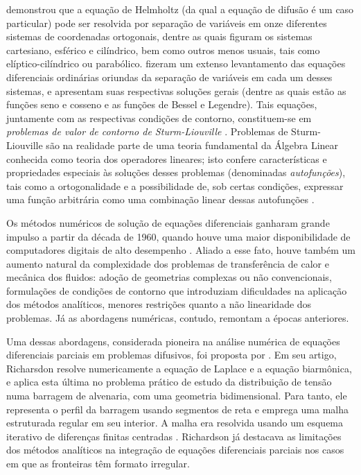 \cite{artigo_einsenhart, artigo_einsenhart_2} demonstrou que a equação de Helmholtz (da qual a equação
de difusão é um caso particular) pode ser resolvida por separação de variáveis em onze diferentes
sistemas de coordenadas ortogonais, dentre as quais figuram os sistemas cartesiano, esférico e cilíndrico, bem como outros menos usuais, tais
como elíptico-cilíndrico ou parabólico. \cite{livro_moon} fizeram um extenso levantamento das equações diferenciais ordinárias
oriundas da separação de variáveis em cada um desses sistemas, e apresentam suas respectivas soluções gerais (dentre as quais estão as funções
seno e cosseno e as funções de Bessel e Legendre). Tais equações, juntamente com as respectivas condições de contorno, constituem-se
em \textit{problemas de valor de contorno de Sturm-Liouville} \citep{artigo_sturm, artigo_liouville}. Problemas de Sturm-Liouville são na realidade
parte de uma teoria fundamental da Álgebra Linear conhecida como teoria dos operadores lineares; isto confere características e propriedades
especiais às soluções desses problemas (denominadas \textit{autofunções}), tais como a ortogonalidade e a possibilidade de, sob certas condições, expressar uma função arbitrária
como uma combinação linear dessas autofunções \citep{livro_boyce, livro_axler}.

Os métodos numéricos de solução de equações diferenciais ganharam grande impulso a partir da década de 1960, quando houve uma maior disponibilidade
de computadores digitais de alto desempenho \citep{livro_tanehill}. Aliado a esse fato, houve também um aumento natural da complexidade dos problemas de transferência
de calor e mecânica dos fluidos: adoção de geometrias complexas ou não convencionais, formulações de condições de contorno que introduziam dificuldades na
aplicação dos métodos analíticos, menores restrições quanto a não linearidade dos problemas. Já as abordagens numéricas, contudo, remontam a épocas anteriores. 

Uma dessas abordagens, considerada pioneira na análise numérica de equações diferenciais parciais em problemas
difusivos, foi proposta por \cite{artigo_richardson}. Em seu artigo, Richarsdon resolve numericamente a equação de Laplace e a equação biarmônica, e aplica esta última no problema prático de estudo da distribuição de tensão numa
barragem de alvenaria, com uma geometria bidimensional. Para tanto, ele representa o perfil da barragem usando segmentos de reta e emprega uma malha estruturada regular em seu interior. A malha
era resolvida usando um esquema iterativo de diferenças finitas centradas \citep{livro_tanehill}. Richardson já destacava as limitações dos métodos analíticos na integração de equações diferenciais parciais nos casos em que as fronteiras têm formato irregular.

